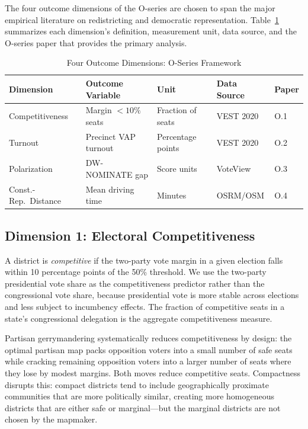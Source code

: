 \label{sec:dimensions}

The four outcome dimensions of the O-series are chosen to span the major empirical
literature on redistricting and democratic representation. Table~\ref{tab:dimensions}
summarizes each dimension's definition, measurement unit, data source, and the
O-series paper that provides the primary analysis.

\begin{table}[ht]
\centering
\caption{Four Outcome Dimensions: O-Series Framework}
\label{tab:dimensions}
\begin{tabular}{lllll}
\toprule
Dimension & Outcome Variable & Unit & Data Source & Paper \\
\midrule
Competitiveness & Margin $< 10\%$ seats & Fraction of seats & VEST 2020 & O.1 \\
Turnout & Precinct VAP turnout & Percentage points & VEST 2020 & O.2 \\
Polarization & DW-NOMINATE gap & Score units & VoteView & O.3 \\
Const.-Rep.\ Distance & Mean driving time & Minutes & OSRM/OSM & O.4 \\
\bottomrule
\end{tabular}
\end{table}

\subsection{Dimension 1: Electoral Competitiveness}

A district is \textit{competitive} if the two-party vote margin in a given election
falls within 10 percentage points of the 50\% threshold. We use the two-party presidential
vote share as the competitiveness predictor rather than the congressional vote share, because
presidential vote is more stable across elections and less subject to incumbency effects.
The fraction of competitive seats in a state's congressional delegation is the aggregate
competitiveness measure.

Partisan gerrymandering systematically reduces competitiveness by design: the optimal
partisan map packs opposition voters into a small number of safe seats while cracking
remaining opposition voters into a larger number of seats where they lose by modest
margins. Both moves reduce competitive seats. Compactness disrupts this: compact
districts tend to include geographically proximate communities that are more
politically similar, creating more homogeneous districts that are either safe or
marginal---but the marginal districts are not chosen by the mapmaker.

